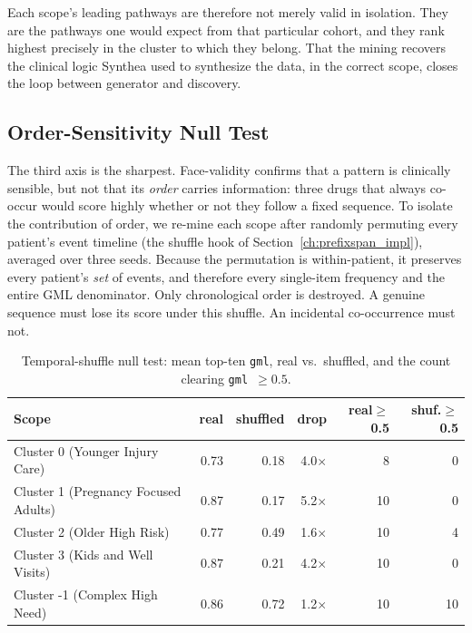 Each scope's leading pathways are therefore not merely valid in isolation. They are the pathways one would expect from that particular cohort, and they rank highest precisely in the cluster to which they belong. That the mining recovers the clinical logic Synthea used to synthesize the data, in the correct scope, closes the loop between generator and discovery.

\subsection{Order-Sensitivity Null Test}

The third axis is the sharpest. Face-validity confirms that a pattern is clinically sensible, but not that its \emph{order} carries information: three drugs that always co-occur would score highly whether or not they follow a fixed sequence. To isolate the contribution of order, we re-mine each scope after randomly permuting every patient's event timeline (the shuffle hook of Section~\ref{ch:prefixspan_impl}), averaged over three seeds. Because the permutation is within-patient, it preserves every patient's \emph{set} of events, and therefore every single-item frequency and the entire GML denominator. Only chronological order is destroyed. A genuine sequence must lose its score under this shuffle. An incidental co-occurrence must not.

\begin{table}[H]
\centering
\footnotesize
\renewcommand{\arraystretch}{1.3}
\begin{tabular}{@{}l r r r r r@{}}
\toprule
\textbf{Scope} & \textbf{real} & \textbf{shuffled} & \textbf{drop} & \textbf{real$\geq$0.5} & \textbf{shuf.$\geq$0.5} \\
\midrule
Cluster 0 (Younger Injury Care)        & 0.73 & 0.18 & 4.0$\times$ & 8  & 0  \\
Cluster 1 (Pregnancy Focused Adults)   & 0.87 & 0.17 & 5.2$\times$ & 10 & 0  \\
Cluster 2 (Older High Risk)            & 0.77 & 0.49 & 1.6$\times$ & 10 & 4  \\
Cluster 3 (Kids and Well Visits)       & 0.87 & 0.21 & 4.2$\times$ & 10 & 0  \\
Cluster -1 (Complex High Need)         & 0.86 & 0.72 & 1.2$\times$ & 10 & 10 \\
\bottomrule
\end{tabular}
\caption{Temporal-shuffle null test: mean top-ten \texttt{gml}, real vs.\ shuffled, and the count clearing \texttt{gml}~$\geq0.5$.}
\label{tab:ch6_seq_nulltest}
\end{table}

